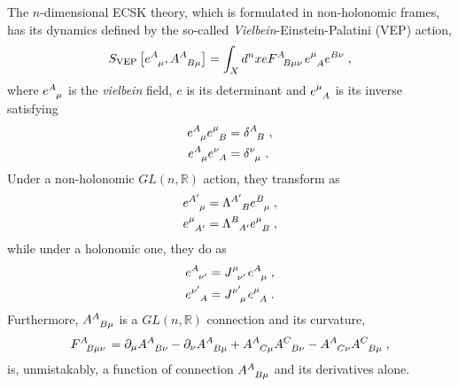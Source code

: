 \documentclass[../../main.tex]{subfiles}
\begin{document}
The $n$-dimensional ECSK theory, which is formulated in non-holonomic frames, has its dynamics defined by the so-called \textit{Vielbein}-Einstein-Palatini (VEP) action,
\begin{equation}
  \label{eq:vep-action}
  S_{\text{VEP}} \left[\tensor{e}{^A_\mu}, \tensor{A}{^A_{B\mu}}\right] = \int_X d^n x e\tensor{F}{^A_{B\mu\nu}}\tensor{e}{^\mu_A}\tensor{e}{^{B\nu}}  \;,
\end{equation}
where $\tensor{e}{^A_\mu}$ is the \textit{vielbein} field, $e$ is its determinant and $\tensor{e}{^\mu_A}$ is its inverse satisfying
\begin{subequations}
  \begin{align}
    \tensor{e}{^A_\mu}\tensor{e}{^\mu_B} & = \tensor{\delta}{^A_B}\;, \label{eq:inversepullbackvielbein} \\
    \tensor{e}{^A_\mu}\tensor{e}{^\nu_A} & = \tensor{\delta}{^\nu_\mu} \label{eq:inversevielbein}\;.
  \end{align}
\end{subequations}
Under a non-holonomic $GL\left(n,\mathbb{R}\right)$ action, they transform as
\begin{subequations}
  \begin{align}
    \label{eq:active_transf_vielbein}
    \tensor{e}{^{A'}_\mu} & = \tensor{\Lambda}{^{A'}_{B}} \tensor{e}{^B_\mu} \;, \\
    \tensor{e}{^\mu_{A'}} & = \tensor{\Lambda}{^{B}_{A'}} \tensor{e}{^\mu_B} \;,
  \end{align}
\end{subequations}
while under a holonomic one, they do as
\begin{subequations}
  \begin{align}
    \label{eq:passive_transf_vielbein}
    \tensor{e}{^A_{\nu'}} & = \tensor{J}{^\mu_{\nu'}} \tensor{e}{^A_\mu} \;, \nonumber \\
    \tensor{e}{^{\nu'}_A} & = \tensor{J}{^{\nu'}_{\mu}} \tensor{e}{^\mu_A} \;.
  \end{align}
\end{subequations}
Furthermore, $\tensor{A}{^A_{B\mu}}$ is a $GL\left(n,\mathbb{R}\right)$ connection and its curvature,
\begin{equation}
  \label{eq:nonholcurvature}
  \tensor{F}{^A_{B\mu\nu}}=\partial_\mu\tensor{A}{^A_{B\nu}}-\partial_\nu\tensor{A}{^A_{B\mu}}+\tensor{A}{^A_{C\mu}}\tensor{A}{^C_{B\nu}}-\tensor{A}{^A_{C\nu}}\tensor{A}{^C_{B\mu}} \;,
\end{equation}
is, unmistakably, a function of connection $\tensor{A}{^A_{B\mu}}$ and its derivatives alone.
\end{document}
